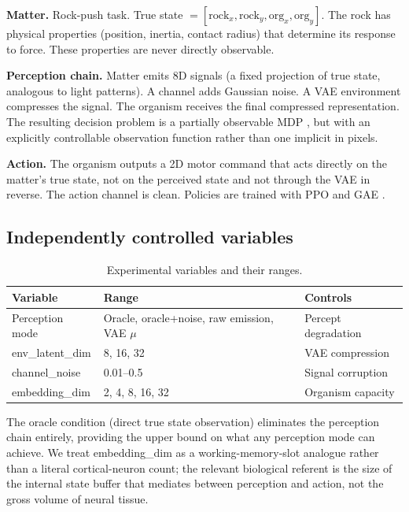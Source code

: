 \documentclass{article}
\begin{document}
\textbf{Matter.} Rock-push task. True state $= [\text{rock}_x, \text{rock}_y,
\text{org}_x, \text{org}_y]$. The rock has physical properties (position, inertia,
contact radius) that determine its response to force. These properties are never
directly observable.

\textbf{Perception chain.} Matter emits 8D signals (a fixed projection of true
state, analogous to light patterns). A channel adds Gaussian noise. A VAE
\citep{kingma2014autoencoding, higgins2017beta} environment compresses the
signal. The organism receives the final compressed representation. The
resulting decision problem is a partially observable MDP
\citep{kaelbling1998planning, hausknecht2015deep, igl2018deep}, but with an
explicitly controllable observation function rather than one implicit in
pixels.

\textbf{Action.} The organism outputs a 2D motor command that acts directly on
the matter's true state, not on the perceived state and not through the VAE in
reverse. The action channel is clean. Policies are trained with PPO
\citep{schulman2017ppo} and GAE \citep{schulman2016gae}.

\subsection{Independently controlled variables}

\begin{table}[h]
\centering
\caption{Experimental variables and their ranges.}
\label{tab:variables}
\begin{tabular}{lll}
\toprule
Variable & Range & Controls \\
\midrule
Perception mode & Oracle, oracle+noise, raw emission, VAE $\mu$ & Percept degradation \\
env\_latent\_dim & 8, 16, 32 & VAE compression \\
channel\_noise & 0.01--0.5 & Signal corruption \\
embedding\_dim & 2, 4, 8, 16, 32 & Organism capacity \\
\bottomrule
\end{tabular}
\end{table}

The oracle condition (direct true state observation) eliminates the perception
chain entirely, providing the upper bound on what any perception mode can achieve.
We treat embedding\_dim as a working-memory-slot analogue rather than a literal
cortical-neuron count; the relevant biological referent is the size of the
internal state buffer that mediates between perception and action, not the gross
volume of neural tissue.
\end{document}
